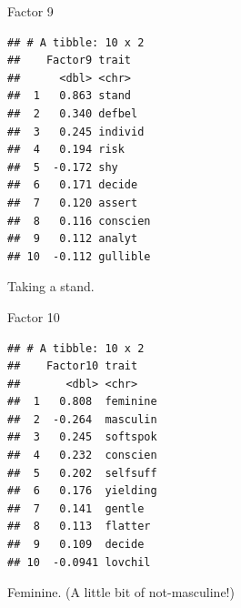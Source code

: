 \documentclass[
  ignorenonframetext,
]{beamer}
\newenvironment{Shaded}{\begin{snugshade}}{\end{snugshade}}
\newcommand{\DecValTok}[1]{\textcolor[rgb]{0.00,0.00,0.81}{#1}}
\newcommand{\KeywordTok}[1]{\textcolor[rgb]{0.13,0.29,0.53}{\textbf{#1}}}
\newcommand{\NormalTok}[1]{#1}
\newcommand{\OperatorTok}[1]{\textcolor[rgb]{0.81,0.36,0.00}{\textbf{#1}}}
\newcommand{\StringTok}[1]{\textcolor[rgb]{0.31,0.60,0.02}{#1}}
\begin{document}
\begin{frame}[fragile]{Factor 9}
\protect\hypertarget{factor-9}{}

\footnotesize

\begin{Shaded}
\end{Shaded}

\begin{verbatim}
## # A tibble: 10 x 2
##    Factor9 trait   
##      <dbl> <chr>   
##  1   0.863 stand   
##  2   0.340 defbel  
##  3   0.245 individ 
##  4   0.194 risk    
##  5  -0.172 shy     
##  6   0.171 decide  
##  7   0.120 assert  
##  8   0.116 conscien
##  9   0.112 analyt  
## 10  -0.112 gullible
\end{verbatim}

\normalsize

Taking a stand.

\end{frame}

\begin{frame}[fragile]{Factor 10}
\protect\hypertarget{factor-10}{}

\footnotesize

\begin{Shaded}
\end{Shaded}

\begin{verbatim}
## # A tibble: 10 x 2
##    Factor10 trait   
##       <dbl> <chr>   
##  1   0.808  feminine
##  2  -0.264  masculin
##  3   0.245  softspok
##  4   0.232  conscien
##  5   0.202  selfsuff
##  6   0.176  yielding
##  7   0.141  gentle  
##  8   0.113  flatter 
##  9   0.109  decide  
## 10  -0.0941 lovchil
\end{verbatim}

\normalsize

Feminine. (A little bit of not-masculine!)

\end{frame}
\end{document}

